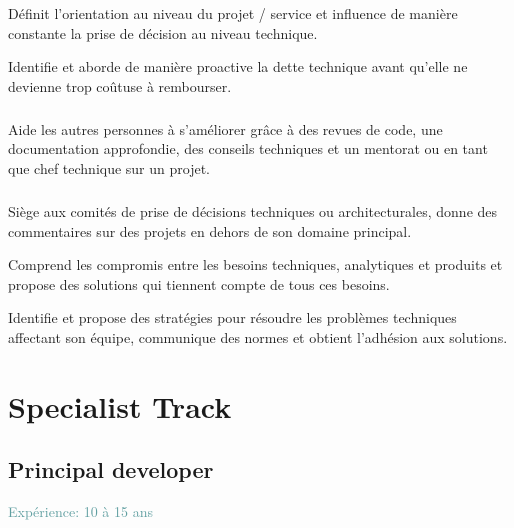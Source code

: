\documentclass[a4paper, french, openany, 12pt]{book}
\newcommand\cha[1]{\textcolor{OliveGreen}{\textbf{\bsc{Cha-{#1}}}}}
\newcommand\xp[1]{\textcolor{CadetBlue}{Expérience: {#1} ans}}
\begin{document}
\begin{multicols}{2}
  Définit l'orientation au niveau du projet / service et influence de manière constante la prise de décision au niveau
  technique.

  Identifie et aborde de manière proactive la dette technique avant qu'elle ne devienne trop coûtuse à rembourser.

  \subsubsection*{\cha{TODO}}

  Aide les autres personnes à s'améliorer grâce à des revues de code, une documentation approfondie, des conseils 
  techniques et un mentorat ou en tant que chef technique sur un projet.

  \subsubsection*{\cha{TODO}}
  Siège aux comités de prise de décisions techniques ou architecturales, donne des commentaires sur des projets en dehors 
  de son domaine principal.

  Comprend les compromis entre les besoins techniques, analytiques et produits et propose des solutions qui tiennent 
  compte de tous ces besoins.

  Identifie et propose des stratégies pour résoudre les problèmes techniques affectant son équipe, communique des normes 
  et obtient l'adhésion aux solutions.

\end{multicols}

\part{Specialist Track}

\chapter{Principal developer}

\xp{10 à 15}
\end{document}
